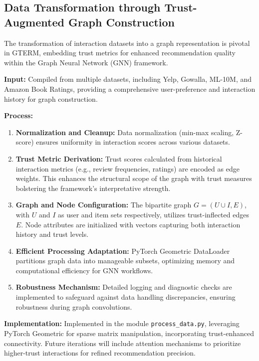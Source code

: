\documentclass{article} %
\begin{document}
\subsection{Data Transformation through Trust-Augmented Graph Construction}

The transformation of interaction datasets into a graph representation is pivotal in GTERM, embedding trust metrics for enhanced recommendation quality within the Graph Neural Network (GNN) framework.

\textbf{Input:} Compiled from multiple datasets, including Yelp, Gowalla, ML-10M, and Amazon Book Ratings, providing a comprehensive user-preference and interaction history for graph construction.

\textbf{Process:}
\begin{enumerate}
    \item \textbf{Normalization and Cleanup:} Data normalization (min-max scaling, Z-score) ensures uniformity in interaction scores across various datasets.
    
    \item \textbf{Trust Metric Derivation:} Trust scores calculated from historical interaction metrics (e.g., review frequencies, ratings) are encoded as edge weights. This enhances the structural scope of the graph with trust measures bolstering the framework's interpretative strength.
    
    \item \textbf{Graph and Node Configuration:} The bipartite graph \(G = (U \cup I, E)\), with \(U\) and \(I\) as user and item sets respectively, utilizes trust-inflected edges \(E\). Node attributes are initialized with vectors capturing both interaction history and trust levels.

    \item \textbf{Efficient Processing Adaptation:} PyTorch Geometric DataLoader partitions graph data into manageable subsets, optimizing memory and computational efficiency for GNN workflows.

    \item \textbf{Robustness Mechanism:} Detailed logging and diagnostic checks are implemented to safeguard against data handling discrepancies, ensuring robustness during graph convolutions.
\end{enumerate}


\textbf{Implementation:} Implemented in the module \texttt{process\_data.py}, leveraging PyTorch Geometric for sparse matrix manipulation, incorporating trust-enhanced connectivity. Future iterations will include attention mechanisms to prioritize higher-trust interactions for refined recommendation precision.
\end{document}
